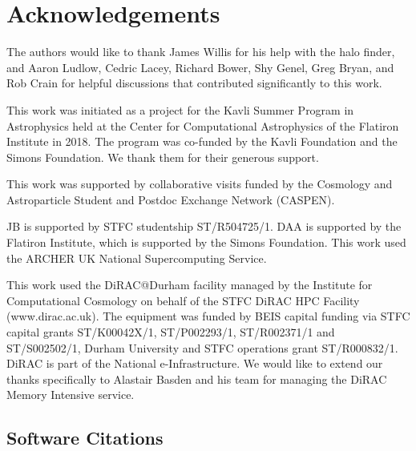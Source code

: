 \section{Acknowledgements}
\label{sec:acknowledgements}

The authors would like to thank James Willis for his help with the
\velociraptor{} halo finder, and Aaron Ludlow, Cedric Lacey, Richard Bower,
Shy Genel, Greg Bryan, and Rob Crain for helpful discussions that contributed
significantly to this work.

This work was initiated as a project for the Kavli Summer Program in
Astrophysics held at the Center for Computational Astrophysics of the
Flatiron Institute in 2018. The program was co-funded by the Kavli Foundation
and the Simons Foundation. We thank them for their generous support.

This work was supported by collaborative visits funded by the Cosmology and
Astroparticle Student and Postdoc Exchange Network (CASPEN).

JB is supported by STFC studentship ST/R504725/1. DAA is supported by the
Flatiron Institute, which is supported by the Simons Foundation. This work
used the ARCHER UK National Supercomputing Service.

This work used the DiRAC@Durham facility managed by the Institute for
Computational Cosmology on behalf of the STFC DiRAC HPC Facility
(www.dirac.ac.uk). The equipment was funded by BEIS capital funding via STFC
capital grants ST/K00042X/1, ST/P002293/1, ST/R002371/1 and ST/S002502/1,
Durham University and STFC operations grant ST/R000832/1. DiRAC is part of
the National e-Infrastructure. We would like to extend our thanks specifically
to Alastair Basden and his team for managing the DiRAC Memory Intensive service. 

\subsection{Software Citations}

